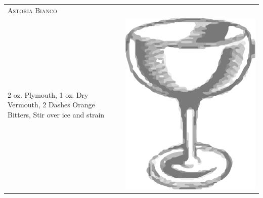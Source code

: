 \documentclass{article}
\begin{document}
\begin{multicols}{2}
\begin{tabular}{p{2in} p{0.5in}}
\multicolumn{2}{p{3in}}{\centering\Huge\textsc{Astoria Bianco}}\\ 
  \vspace{-0.1in}2 oz. Plymouth, 1 oz. Dry Vermouth, 2 Dashes Orange Bitters, Stir over ice and strain &
  \vspace{-0.1in} \includegraphics{egg_coupe.png}
\end{tabular}


\end{multicols}
\end{document}
